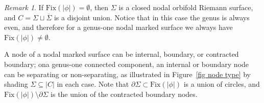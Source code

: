 \documentclass[11pt]{amsart}
\theoremstyle{definition}
\theoremstyle{remark}
\newtheorem{rmk}[dummy]{Remark}
\newcommand{\<}{\left<}
\renewcommand{\>}{\right>}
\numberwithin{equation}{section}
\begin{document}
\begin{rmk}
    If $\text{Fix}(|\phi|)=\emptyset$, then $\Sigma$ is a closed nodal orbifold Riemann surface, and $C=\Sigma \sqcup \overline{\Sigma}$ is a disjoint union. Notice that in this case the genus is always even, and therefore for a genus-one nodal marked surface we always have $\text{Fix}(|\phi|)\ne \emptyset$.
\end{rmk}




A node of a nodal marked surface can be %
internal, boundary, or %
contracted %
boundary; ona genus-one connected %
component, an internal or boundary node can be separating or non-separating, as illustrated in Figure~\ref{fig node type} by shading $\Sigma \subseteq |C|$ in each case.  Note that ${\partial}\Sigma\subset\text{Fix}(|\phi|)$ is a union of circles, and $\text{Fix}(|\phi|)\setminus{\partial}\Sigma$ is the union of the contracted boundary %
nodes.
\end{document}
